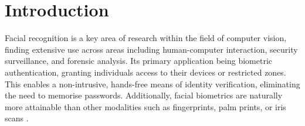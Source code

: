 \documentclass{mpaper}
\begin{document}
\section{Introduction}
Facial recognition is a key area of research within the field of computer vision, finding extensive use across areas including human-computer interaction, security surveillance, and forensic analysis. Its primary application being biometric authentication, granting individuals access to their devices or restricted zones. This enables a non-intrusive, hands-free means of identity verification, eliminating the need to memorise passwords. Additionally, facial biometrics are naturally more attainable than other modalities such as fingerprints, palm prints, or iris scans \cite{zhou20183d}.
\end{document}
